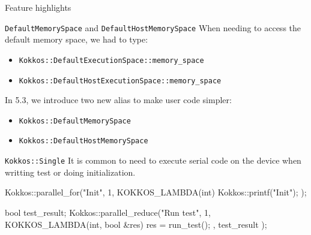 
\begin{frame}[fragile]

  {\Huge Feature highlights}

  \vspace{10pt}

\end{frame}


\begin{frame}[fragile]{\texttt{DefaultMemorySpace} and \texttt{DefaultHostMemorySpace}}
  When needing to access the default memory space, we had to type:
  \begin{itemize}
    \item \texttt{Kokkos::DefaultExecutionSpace::memory\_space}
    \item \texttt{Kokkos::DefaultHostExecutionSpace::memory\_space}
  \end{itemize}
  \vspace{1em}
  \pause
  In 5.3, we introduce two new alias to make user code simpler:
  \begin{itemize}
    \item \texttt{Kokkos::DefaultMemorySpace}
    \item \texttt{Kokkos::DefaultHostMemorySpace}
  \end{itemize}
\end{frame}

\begin{frame}[fragile]{\texttt{Kokkos::Single}}
  It is common to need to execute serial code on the device when writting test or doing initialization.

    \begin{code}[keywords={KOKKOS_LAMBDA,parallel_for,single,parallel_reduce}]
  Kokkos::parallel_for("Init", 1,
      KOKKOS_LAMBDA(int) {
          Kokkos::printf("Init\n");
      }
  );

  bool test_result;
  Kokkos::parallel_reduce("Run test", 1,
       KOKKOS_LAMBDA(int, bool &res) {
          res = run_test();
      },
      test_result
  );
    \end{code}
\end{frame}

